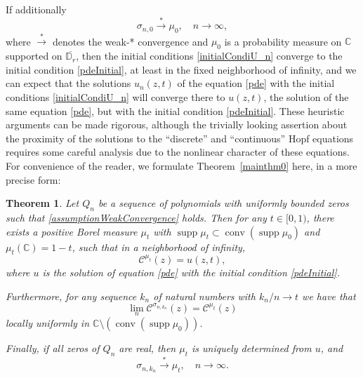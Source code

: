 \documentclass[reqno,11pt]{amsart}
\theoremstyle{plain}
\newtheorem{thm}{Theorem}[section]
\theoremstyle{definition}
\theoremstyle{remark}
\numberwithin{equation}{section}
\numberwithin{equation}{section}
\DeclareMathOperator{\supp}{supp}
\DeclareMathOperator{\conv}{conv}
\newcommand{\C}{\mathbb{C}}
\newcommand{\D}{\mathbb{D}}
\begin{document}
If additionally
\begin{equation} \label{assumptionWeakConvergence}
	\sigma_{n,0}  \stackrel{*}{\longrightarrow} \mu_0, \quad n\to \infty,
\end{equation}
where $\stackrel{*}{\longrightarrow}$ denotes the weak-* convergence and $\mu_0$ is a  probability measure on $\C$ supported on $\overline{\D_r}$, then the initial conditions \eqref{initialCondiU_n} converge to the initial condition \eqref{pdeInitial}, at least in the fixed neighborhood of infinity, and we can expect that the solutions $u_n(z,t)$ of the equation \eqref{pde} with the initial conditions \eqref{initialCondiU_n} will converge there to $u(z,t)$, the solution of the same equation \eqref{pde}, but with the initial condition \eqref{pdeInitial}. These heuristic arguments can be made rigorous, although the trivially looking assertion about the proximity of the solutions to the ``discrete'' and ``continuous'' Hopf equations requires some careful analysis due to the nonlinear character of these equations. For convenience of the reader, we formulate Theorem~\ref{mainthm0} here, in a more precise form:
\begin{thm} \label{mainthm2}
 Let $Q_n$ be a sequence of polynomials with uniformly bounded zeros such that \eqref{assumptionWeakConvergence} holds. 
Then for any $t \in[0,1)$, there exists a positive Borel measure $\mu_t$ with $\supp \mu_t \subset \conv (\supp \mu_0)$ and $\mu_t(\C)=1-t$, such that in a neighborhood of infinity,
\begin{equation} \label{coincidenceCauchy}
 \mathcal C^{\mu_t}(z) =u(z,t),
\end{equation}
where $u$  is the solution of equation \eqref{pde} with the initial condition \eqref{pdeInitial}. 

Furthermore, for any sequence $k_n$ of natural numbers with $k_n / n \rightarrow t$ we have that
	$$
	\lim_n  \mathcal C^{  \sigma_{n,k_n}}(z) =\mathcal C^{\mu_t}(z)
	$$
	locally uniformly in $\C\setminus \left( \conv (\supp \mu_0)\right)$.
 
	Finally, if all zeros of $Q_n$ are real, then $\mu_t$ is uniquely determined from $u$, and  
	$$
	\sigma_{n, k_n} \stackrel{*}{\longrightarrow} \mu_t, \quad n \to \infty. 
	$$
\end{thm}
\end{document}
